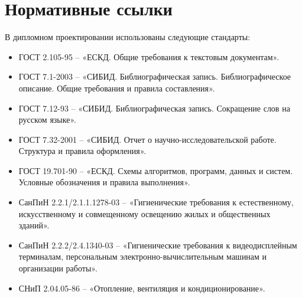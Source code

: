 \section*{Нормативные ссылки}

В дипломном проектировании использованы следующие стандарты:
\begin{itemize}
\item ГОСТ 2.105-95 -- «ЕСКД. Общие требования к текстовым документам».
\item ГОСТ 7.1-2003  -- «СИБИД. Библиографическая запись. Библиографическое описание. Общие требования и правила составления».
\item ГОСТ 7.12-93 -- «СИБИД. Библиографическая запись. Сокращение слов на русском языке».
\item ГОСТ 7.32-2001 -- «СИБИД. Отчет о научно-исследовательской работе. Структура и правила оформления».
\item ГОСТ 19.701-90 -- «ЕСКД. Схемы алгоритмов, программ, данных и систем. Условные обозначения и правила выполнения».
\item СанПиН 2.2.1/2.1.1.1278-03 -- «Гигиенические требования к естественному, искусственному и совмещенному освещению жилых и общественных зданий».
\item СанПиН 2.2.2/2.4.1340-03 -- «Гигиенические требования к видеодисплейным терминалам, персональным электронно-вычислительным машинам и организации работы».
\item СНиП 2.04.05-86  --  «Отопление, вентиляция и кондиционирование».
\end{itemize}

